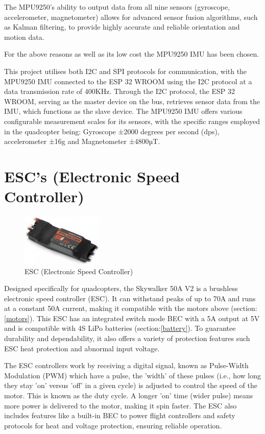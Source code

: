 \documentclass{report}
\begin{document}
The MPU9250's ability to output data from all nine sensors (gyroscope,
accelerometer, magnetometer) allows for advanced sensor fusion algorithms, such
as Kalman filtering, to provide highly accurate and reliable orientation and
motion data.

For the above reasons as well as its low cost the MPU9250 IMU has been chosen.

This project utilises both I2C and SPI protocols for communication, with the
MPU9250 IMU connected to the ESP 32 WROOM using the I2C protocol at a data
transmission rate of 400KHz. Through the I2C protocol, the ESP 32 WROOM, serving
as the master device on the bus, retrieves sensor data from the IMU, which
functions as the slave device. The MPU9250 IMU offers various configurable
measurement scales for its sensors, with the specific ranges employed in the
quadcopter being: Gyroscope ±2000 degrees per second (dps), accelerometer ±16g
and Magnetometer ±4800µT.

\section{ESC's (Electronic Speed Controller)}\label{esc}
\begin{figure}[H]
  \centering
  \includegraphics[width=0.35\textwidth]{Pictures/esc.png}
  \caption{ESC (Electronic Speed Controller)}
  \label{fig:esc}
\end{figure}
Designed specifically for quadcopters, the Skywalker 50A V2 is a brushless
electronic speed controller (ESC). It can withstand peaks of up to 70A and runs
at a constant 50A current, making it compatible with the motors above
(section:\ref{motors}). This ESC has an integrated switch mode BEC with a 5A
output at 5V and is compatible with 4S LiPo batteries (section:\ref{battery}).
To guarantee durability and dependability, it also offers a variety of
protection features such ESC heat protection and abnormal input voltage.

The ESC controllers work by receiving a digital signal, known as Pulse-Width
Modulation (PWM) which have a pulse, the 'width' of these pulses (i.e., how long
they stay 'on' versus 'off' in a given cycle) is adjusted to control the speed
of the motor. This is known as the duty cycle. A longer 'on' time (wider pulse)
means more power is delivered to the motor, making it spin faster. The ESC also
includes features like a built-in BEC to power flight controllers and safety
protocols for heat and voltage protection, ensuring reliable operation.
\end{document}
